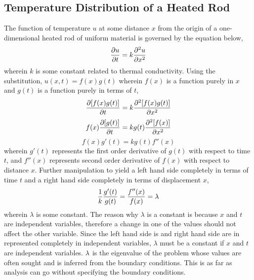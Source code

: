 \documentclass[class=report, 12pt, crop=false]{standalone}
\begin{document}
\begin{center}
\chapter{Temperature Distribution of a Heated Rod}
\begin{comment} 
Physics Archives
Havent inserted Sturm Liouville orthonormal basis functions
\end{comment}
The function of temperature $u$ at some distance $x$ from the origin of a one-dimensional heated rod of uniform material is governed by the equation below,
$$\frac{\partial u}{\partial t} = k\frac{\partial^2 u}{\partial x^2}$$                                                                  wherein $k$ is some constant related to thermal conductivity. Using the substitution, $u(x,t) = f(x)g(t)$ wherein $f(x)$ is a function purely in $x$ and $g(t)$ is a function purely in terms of $t$,
$$\frac{\partial [f(x)g(t)]}{\partial t} = k\frac{\partial^2 [f(x)g(t)]}{\partial x^2}$$
$$f(x)\frac{\partial [g(t)]}{\partial t} = kg(t)\frac{\partial^2 [f(x)]}{\partial x^2}$$
$$f(x)g'(t) = kg(t)f''(x)$$wherein $g'(t)$ represents the first order derivative of $g(t)$ with respect to time $t$, and $f''(x)$ represents second order derivative of $f(x)$ with respect to distance $x$. Further manipulation to yield a left hand side completely in terms of time $t$ and a right hand side completely in terms of displacement $x$,
$$\frac{1}{k}\frac{g'(t)}{g(t)} = \frac{f''(x)}{f(x)} = \lambda$$wherein $\lambda$ is some constant. The reason why $\lambda$ is a constant is because $x$ and $t$ are independent variables, therefore a change in one of the values should not affect the other variable. Since the left hand side is and right hand side are in represented completely in independent variables, $\lambda$ must be a constant if $x$ and $t$ are independent variables. $\lambda$ is the eigenvalue of the problem whose values are often sought and is inferred from the boundary conditions. This is as far as analysis can go without specifying the boundary conditions.

\end{center}
\end{document}
